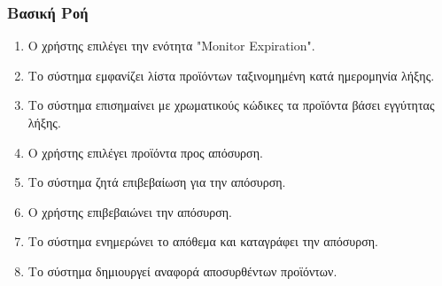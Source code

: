 \documentclass[12pt,a4paper,twoside]{book}
\begin{document}
\subsubsection{Βασική Ροή}
\begin{enumerate}
  \item Ο χρήστης επιλέγει την ενότητα "Monitor Expiration". %
  \item Το σύστημα εμφανίζει λίστα προϊόντων ταξινομημένη κατά ημερομηνία λήξης.
  \item Το σύστημα επισημαίνει με χρωματικούς κώδικες τα προϊόντα βάσει εγγύτητας λήξης.
  \item Ο χρήστης επιλέγει προϊόντα προς απόσυρση.
  \item Το σύστημα ζητά επιβεβαίωση για την απόσυρση.
  \item Ο χρήστης επιβεβαιώνει την απόσυρση.
  \item Το σύστημα ενημερώνει το απόθεμα και καταγράφει την απόσυρση.
  \item Το σύστημα δημιουργεί αναφορά αποσυρθέντων προϊόντων.
\end{enumerate}
\end{document}
